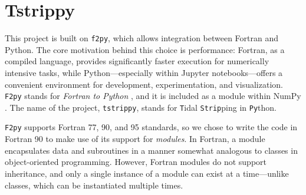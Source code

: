 \documentclass{article}
\begin{document}
\section{Tstrippy}

    This project is built on \texttt{f2py}, which allows integration between Fortran and Python. The core motivation behind this choice is performance: Fortran, as a compiled language, provides significantly faster execution for numerically intensive tasks, while Python—especially within Jupyter notebooks—offers a convenient environment for development, experimentation, and visualization. \texttt{F2py} stands for \textit{Fortran to Python} \citep{peterson2009f2py}, and it is included as a module within NumPy \citep{numpy_f2py_manual,2020Natur.585..357H}. The name of the project, \texttt{tstrippy}, stands for \texttt{T}idal \texttt{Strip}ping in \texttt{Py}thon.

    \texttt{F2py} supports Fortran 77, 90, and 95 standards, so we chose to write the code in Fortran 90 to make use of its support for \textit{modules}. In Fortran, a module encapsulates data and subroutines in a manner somewhat analogous to classes in object-oriented programming. However, Fortran modules do not support inheritance, and only a single instance of a module can exist at a time—unlike classes, which can be instantiated multiple times.
\end{document}
